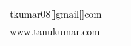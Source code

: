 \documentclass[letterpaper, 10pt]{article}
\begin{document}


\vspace{0.3cm} 
\begin{center}
\begin{tabular}{lll}
 tkumar08[]gmail[]com      &
\hspace{3.7in}     &
\hspace{3.7in} 	 \\


www.tanukumar.com  & 
\hspace{3.7in}  & 
\hspace{3.7in} \end{tabular}
\end{center}


\setlength{\tabcolsep}{8pt}
\end{document}
